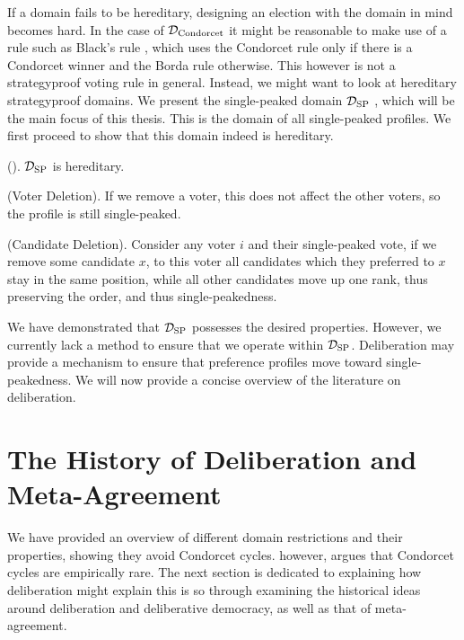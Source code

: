 If a domain fails to be hereditary, designing an election with the domain in
mind becomes hard. In the case of $\mathcal{D}_{\textnormal{Condorcet}}$ it might be reasonable
to make use of a rule such as Black's rule
\cite{blackRationaleGroupDecisionmaking1948}, which uses the Condorcet rule
only if there is a Condorcet winner and the Borda rule otherwise. This however
is not a strategyproof voting rule in general. Instead, we might want to look
at hereditary strategyproof domains. We present the single-peaked domain $\mathcal{D}_{\textnormal{SP}}$ , which
will be the main focus of this thesis. This is the domain of all single-peaked
profiles. We first proceed to show that this domain indeed is hereditary.


\begin{proposition}{\textnormal{(\citet{elkindPreferenceRestrictionsComputational2022}).}}
	$\mathcal{D}_{\textnormal{SP}}$ is hereditary.
\end{proposition}

\begin{proofc}
	(Voter Deletion). If we remove a voter, this does not affect the other voters, so the profile is still single-peaked.~\checkmark

	(Candidate Deletion). Consider any voter $i$ and their single-peaked
	vote, if we remove some candidate $x$, to this voter all candidates which they preferred to $x$ stay in the same position, while all other candidates move
	up one rank, thus preserving the order, and thus single-peakedness.~\checkmark
\end{proofc}


We have demonstrated that $\mathcal{D}_{\textnormal{SP}}$ possesses the desired properties.
However, we currently lack a method to ensure that we operate within
$\mathcal{D}_{\textnormal{SP}}$. Deliberation may provide a mechanism to ensure that preference
profiles move toward single-peakedness. We will now provide a concise
overview of the literature on deliberation.

\section{The History of Deliberation and Meta-Agreement}

We have provided an overview of different domain restrictions and their
properties, showing they avoid Condorcet cycles.
\citet{bochslerMarquisCondorcetGoes2010} however, argues that Condorcet cycles
are empirically rare. The next section is dedicated to explaining how
deliberation might explain this is so through examining the historical ideas
around deliberation and deliberative democracy, as well as that of
meta-agreement.

